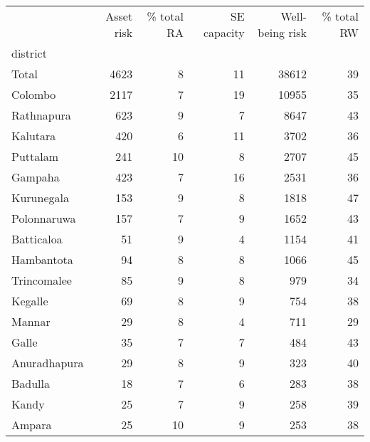 \begin{tabular}{lrrrrr}
\toprule
{} &  Asset risk &  \% total RA &  SE capacity &  Well-being risk &  \% total RW \\
district     &             &             &              &                  &             \\
\midrule
Total        &        4623 &           8 &           11 &            38612 &          39 \\
Colombo      &        2117 &           7 &           19 &            10955 &          35 \\
Rathnapura   &         623 &           9 &            7 &             8647 &          43 \\
Kalutara     &         420 &           6 &           11 &             3702 &          36 \\
Puttalam     &         241 &          10 &            8 &             2707 &          45 \\
Gampaha      &         423 &           7 &           16 &             2531 &          36 \\
Kurunegala   &         153 &           9 &            8 &             1818 &          47 \\
Polonnaruwa  &         157 &           7 &            9 &             1652 &          43 \\
Batticaloa   &          51 &           9 &            4 &             1154 &          41 \\
Hambantota   &          94 &           8 &            8 &             1066 &          45 \\
Trincomalee  &          85 &           9 &            8 &              979 &          34 \\
Kegalle      &          69 &           8 &            9 &              754 &          38 \\
Mannar       &          29 &           8 &            4 &              711 &          29 \\
Galle        &          35 &           7 &            7 &              484 &          43 \\
Anuradhapura &          29 &           8 &            9 &              323 &          40 \\
Badulla      &          18 &           7 &            6 &              283 &          38 \\
Kandy        &          25 &           7 &            9 &              258 &          39 \\
Ampara       &          25 &          10 &            9 &              253 &          38 \\

\end{tabular}

